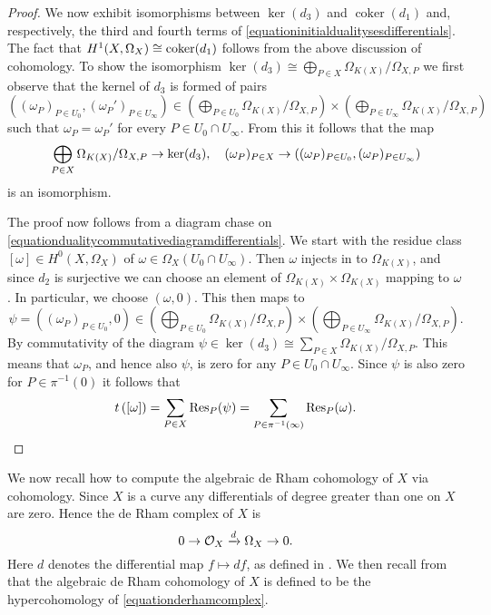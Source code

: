 \begin{proof}
    We now exhibit isomorphisms between $\ker(d_3)$ and $\operatorname{coker}(d_1)$ and, respectively, the third and fourth terms of \eqref{equationinitialdualitysesdifferentials}.
    The fact that $H^1(X,\Omega_X) \cong {\rm coker}(d_1)$ follows from the above discussion of \cech cohomology.
    To show the isomorphism $\ker(d_3) \cong \bigoplus_{P \in X} \Omega_{K(X)}/\Omega_{X,P}$ we first observe that the kernel of $d_3$ is formed of pairs $ ((\omega_P)_{P \in U_0}, (\omega_P')_{P \in U_\infty})\in \left( \bigoplus_{P \in U_0} \Omega_{K(X)}/\Omega_{X,P} \right) \times \left( \bigoplus_{P \in  U_\infty} \Omega_{K(X)}/\Omega_{X,P} \right)$ such that $\omega_P = \omega_P'$ for every $ P \in U_0 \cap U_\infty$.
    From this it follows that the map 
        \[
        \bigoplus_{P \in X} \Omega_{K(X)}/\Omega_{X,P}\rightarrow\ker(d_3), \quad  (\omega_P)_{P \in X} \to \left( (\omega_P)_{ P \in U_0}, (\omega_P)_{P \in U_\infty} \right)
        \]
    is an isomorphism.
    
    The proof now follows from a diagram chase on \eqref{equationdualitycommutativediagramdifferentials}.
    We start with the residue class $[ \omega ] \in H^0(X,\Omega_X)$ of $\omega \in \Omega_X(U_0 \cap U_\infty)$.
    Then $\omega$ injects in to $\Omega_{K(X)}$, and since $d_2$ is surjective we can choose an element of $\Omega_{K(X)} \times \Omega_{K(X)}$ mapping to $\omega$.
    In particular, we choose $(\omega,0)$.
    This then maps to 
        \[
        \psi = (({\omega}_P)_{P\in U_0}, 0) \in \left( \bigoplus_{P \in U_0} \Omega_{K(X)}/\Omega_{X,P}\right) \times \left( \bigoplus_{P \in U_\infty} \Omega_{K(X)}/\Omega_{X,P} \right).
        \]
    By commutativity of the diagram $\psi \in \ker(d_3) \cong \sum_{P \in X}\Omega_{K(X)}/\Omega_{X,P}$.
    This means that $\omega_P$, and hence also $\psi$, is zero for any $P \in U_0 \cap U_\infty$.
    Since $\psi$ is also zero for $P \in \pi^{-1}(0)$ it follows that 
        \[
        t\left([ \omega ] \right) = \sum_{P \in X}\operatorname{Res}_P(\psi) = \sum_{P \in \pi^{-1}(\infty)} \operatorname{Res}_P(\omega).
        \]
    \end{proof}

We now recall how to compute the algebraic de Rham cohomology of $X$ via \cech cohomology.
Since $X$ is a curve any differentials of degree greater than one on $X$ are zero.
Hence the de Rham complex of $X$ is 
    \begin{equation}\label{equationderhamcomplex}
    0 \rightarrow {\cal O}_X \xrightarrow{d} \Omega_X \rightarrow 0.
    \end{equation}
Here $d$ denotes the differential map $f \mapsto df$, as defined in \cite[Chap.\ II, Pg.\ 172]{hart}.
We then recall from \cite[Pg.\ 351]{grothendiecklettertoatiyah} that the algebraic de Rham cohomology of $X$ is defined to be the hypercohomology of \eqref{equationderhamcomplex}.

